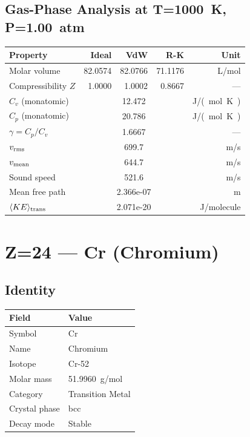 \documentclass[11pt,a4paper]{article}
\begin{document}
\subsection{Gas-Phase Analysis at T=\SI{1000}{K}, P=\SI{1.00}{atm}}
\begin{tabular}{lrrrr}
  \toprule
  Property & Ideal & VdW & R-K & Unit \\
  \midrule
  Molar volume & 82.0574 & 82.0766 & 71.1176 & \si{L/mol} \\
  Compressibility $Z$ & 1.0000 & 1.0002 & 0.8667 & --- \\
  \midrule
  $C_v$ (monatomic) & \multicolumn{3}{c}{12.472} & \si{J/(mol.K)} \\
  $C_p$ (monatomic) & \multicolumn{3}{c}{20.786} & \si{J/(mol.K)} \\
  $\gamma = C_p/C_v$ & \multicolumn{3}{c}{1.6667} & --- \\
  $v_{\rm rms}$ & \multicolumn{3}{c}{699.7} & \si{m/s} \\
  $v_{\rm mean}$ & \multicolumn{3}{c}{644.7} & \si{m/s} \\
  Sound speed & \multicolumn{3}{c}{521.6} & \si{m/s} \\
  Mean free path & \multicolumn{3}{c}{2.366e-07} & \si{m} \\
  $\langle KE \rangle_{\rm trans}$ & \multicolumn{3}{c}{2.071e-20} & \si{J/molecule} \\
  \bottomrule
\end{tabular}

\newpage

\section{Z=24 --- Cr (Chromium)}
\label{sec:Z24}

\subsection{Identity}
\begin{tabular}{ll}
  \toprule
  Field & Value \\
  \midrule
  Symbol & Cr \\
  Name & Chromium \\
  Isotope & Cr-52 \\
  Molar mass & \SI{51.9960}{g/mol} \\
  Category & Transition Metal \\
  Crystal phase & bcc \\
  Decay mode & Stable \\
  \bottomrule
\end{tabular}
\end{document}
